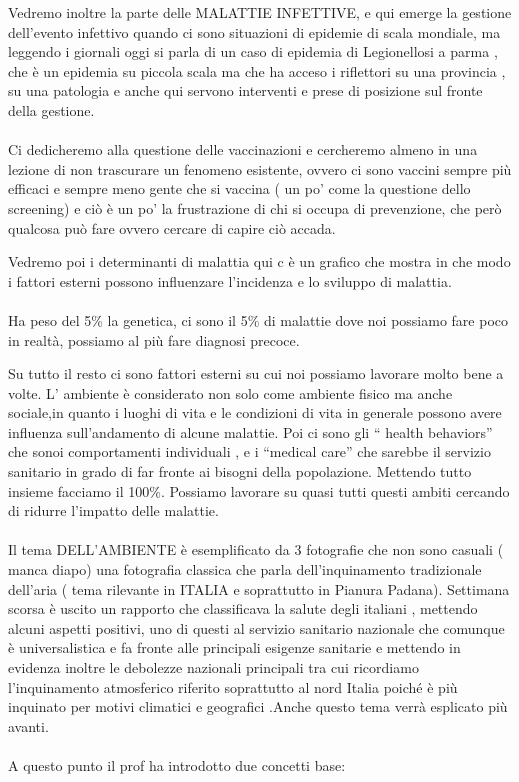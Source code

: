   Vedremo inoltre la parte delle MALATTIE INFETTIVE, e qui emerge la
  gestione dell'evento infettivo quando ci sono situazioni di epidemie
  di scala mondiale, ma leggendo i giornali oggi si parla di un caso di
  epidemia di Legionellosi a parma , che è un epidemia su piccola scala
  ma che ha acceso i riflettori su una provincia , su una patologia e
  anche qui servono interventi e prese di posizione sul fronte della
  gestione.
\\\\
  Ci dedicheremo alla questione delle vaccinazioni e cercheremo almeno
  in una lezione di non trascurare un fenomeno esistente, ovvero ci sono
  vaccini sempre più efficaci e sempre meno gente che si vaccina ( un
  po' come la questione dello screening) e ciò è un po' la frustrazione
  di chi si occupa di prevenzione, che però qualcosa può fare ovvero
  cercare di capire ciò accada.

  Vedremo poi i determinanti di malattia qui c è un grafico che mostra
  in che modo i fattori esterni possono influenzare l'incidenza e lo
  sviluppo di malattia.
\\\\
  Ha peso del 5\% la genetica, ci sono il 5\% di malattie dove noi
  possiamo fare poco in realtà, possiamo al più fare diagnosi precoce.

  Su tutto il resto ci sono fattori esterni su cui noi possiamo lavorare
  molto bene a volte. L' ambiente è considerato non solo come ambiente
  fisico ma anche sociale,in quanto i luoghi di vita e le condizioni di
  vita in generale possono avere influenza sull'andamento di alcune
  malattie. Poi ci sono gli `` health behaviors'' che sonoi
  comportamenti individuali , e i ``medical care'' che sarebbe il
  servizio sanitario in grado di far fronte ai bisogni della
  popolazione. Mettendo tutto insieme facciamo il 100\%. Possiamo
  lavorare su quasi tutti questi ambiti cercando di ridurre l'impatto
  delle malattie.
\\\\
  Il tema DELL'AMBIENTE è esemplificato da 3 fotografie che non sono
  casuali ( manca diapo) una fotografia classica che parla
  dell'inquinamento tradizionale dell'aria ( tema rilevante in ITALIA e
  soprattutto in Pianura Padana). Settimana scorsa è uscito un rapporto
  che classificava la salute degli italiani , mettendo alcuni aspetti
  positivi, uno di questi al servizio sanitario nazionale che comunque è
  universalistica e fa fronte alle principali esigenze sanitarie e
  mettendo in evidenza inoltre le debolezze nazionali principali tra cui
  ricordiamo l'inquinamento atmosferico riferito soprattutto al nord
  Italia poiché è più inquinato per motivi climatici e geografici .Anche
  questo tema verrà esplicato più avanti.
\\\\
  A questo punto il prof ha introdotto due concetti base:


